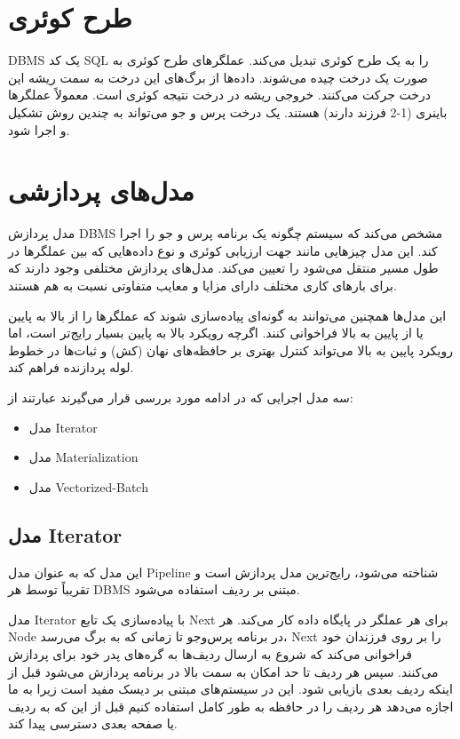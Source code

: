 
\section{طرح کوئری }
DBMS
یک کد SQL را به یک طرح کوئری تبدیل می‌کند. عملگرهای طرح کوئری به صورت یک درخت چیده می‌شوند. داده‌ها از برگ‌های این درخت به سمت ریشه این درخت جرکت می‌کنند. خروجی ریشه در درخت نتیجه کوئری است. معمولاً عملگرها باینری (1-2 فرزند دارند) هستند. یک درخت پرس و جو می‌تواند به چندین روش تشکیل و اجرا شود.

\section{مدل‌های پردازشی}
مدل پردازش DBMS مشخص می‌کند که سیستم چگونه یک برنامه پرس و جو را اجرا کند. این مدل چیزهایی مانند جهت ارزیابی کوئری و نوع داده‌هایی که بین عملگرها در طول مسیر منتقل می‌شود را تعیین می‌کند. مدل‌های پردازش مختلفی وجود دارند که برای بارهای کاری مختلف دارای مزایا و معایب متفاوتی نسبت به هم هستند.

این مدل‌ها همچنین می‌توانند به گونه‌ای پیاده‌سازی شوند که عملگرها را از بالا به پایین یا از پایین به بالا فراخوانی کنند. اگرچه رویکرد بالا به پایین بسیار رایج‌تر است، اما رویکرد پایین به بالا می‌تواند کنترل بهتری بر حافظه‌های نهان (کش‌) و ثبات‌ها در خطوط لوله پردازنده فراهم کند.

سه مدل اجرایی که در ادامه مورد بررسی قرار می‌گیرند عبارتند از:


\begin{itemize}
	\item مدل Iterator
	\item مدل Materialization
	\item مدل Vectorized-Batch
\end{itemize}

\subsection{مدل Iterator}

این مدل که به عنوان مدل Pipeline شناخته می‌شود، رایج‌ترین مدل پردازش است و تقریباً توسط هر DBMS مبتنی بر ردیف استفاده می‌شود.

مدل Iterator با پیاده‌سازی یک تابع Next برای هر عملگر در پایگاه داده کار می‌کند. هر Node در برنامه پرس‌وجو تا زمانی که به برگ می‌رسد، Next را بر روی فرزندان خود فراخوانی می‌کند که شروع به ارسال ردیف‌ها به گره‌های پدر خود برای پردازش می‌کنند. 
سپس هر ردیف تا حد امکان به سمت بالا در برنامه پردازش می‌شود قبل از اینکه ردیف بعدی بازیابی شود. این در سیستم‌های مبتنی بر دیسک مفید است زیرا به ما اجازه می‌دهد هر ردیف را در حافظه به طور کامل استفاده کنیم قبل از این که به ردیف یا صفحه بعدی دسترسی پیدا کند. 

